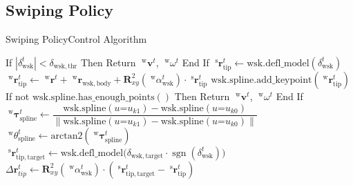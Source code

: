 \documentclass[AIRbeamer
,optEnglish
,optBiber
,optBibstyleAlphabetic
,optBeamerClassicFormat%
]{AIRlatex}
\begin{document}
    \subsection{Swiping Policy}
    \begin{frame}{Swiping Policy}{Control Algorithm}
        \begin{algorithm}[H]
            \caption{Swiping Policy}
            \begin{algorithmic}[1]
                {
                    \State If \(|\delta_{\mathrm{wsk}}^{t}| < \delta_{\mathrm{wsk, thr}}\)
                    Then
                    \State \quad Return \(\;^{\mathrm{w}}\boldsymbol{v}^{t}\), \(\;^{\mathrm{w}}\omega^{t}\)
                    \State End If
                    \State
                    \State \(\;^{\mathrm{s}}\boldsymbol{r}_{\mathrm{tip}}^{t} \gets \mathrm{wsk.defl\_model}(\delta_{\mathrm{wsk}}^{t})\)
                    \State \(\;^{\mathrm{w}}\boldsymbol{r}_{\mathrm{tip}}^{t} \gets \;^{\mathrm{w}}\boldsymbol{r}^{t} + \;^{\mathrm{w}}\boldsymbol{r}_{\mathrm{wsk, body}} + \boldsymbol{R}_{xy}^{2}(\; ^{\mathrm{w}}\alpha_{\mathrm{wsk}}^{t}) \cdot \;^{\mathrm{s}}\boldsymbol{r}_{\mathrm{tip}}^{t}\)
                    \State \colorbox{yellow!40}{\(\mathrm{wsk.spline.add\_keypoint}(\;^{\mathrm{w}}\boldsymbol{r}_{\mathrm{tip}}^{t})\)}
                    \State If not \(\mathrm{wsk.spline.has\_enough\_points()}\)
                    Then
                    \State \quad Return \(\;^{\mathrm{w}}\boldsymbol{v}^{t}\), \(\;^{\mathrm{w}}\omega^{t}\)
                    \State End If
                }
                {
                    \setcounter{ALG@line}{10}
                    \State \(\;^{\mathrm{w}}\boldsymbol{\tau}_{\mathrm{spline}}^{t} \gets \dfrac{\mathrm{wsk.spline}(u\mathord{=}u_{k1}) - \mathrm{wsk.spline}(u\mathord{=}u_{k0})}{\|\mathrm{wsk.spline}(u\mathord{=}u_{k1}) - \mathrm{wsk.spline}(u\mathord{=}u_{k0})\|}\)
                    \State \colorbox{cyan!40}{\(\;^{\mathrm{w}}\theta_{\mathrm{spline}}^{t} \gets \mathrm{arctan2}(\;^{\mathrm{w}}\boldsymbol{\tau}_{\mathrm{spline}}^{t})\)}
                    \State \(\;^{\mathrm{s}}\boldsymbol{r}_{\mathrm{tip, target}}^{t} \gets \mathrm{wsk.defl\_model}\big(\delta_{\mathrm{wsk, target}} \cdot \operatorname{sgn}(\delta_{\mathrm{wsk}}^{t})\big)\)
                    \State \(\Delta\boldsymbol{r}_{tip}^{t} \gets \boldsymbol{R}_{xy}^{2}(\; ^{\mathrm{w}}\alpha_{\mathrm{wsk}}^{t}) \cdot (\;^{\mathrm{s}}\boldsymbol{r}_{\mathrm{tip, target}}^{t} - \;^{\mathrm{s}}\boldsymbol{r}_{\mathrm{tip}}^{t})\)
}
\end{algorithmic}
\end{algorithm}
\end{frame}
\end{document}
